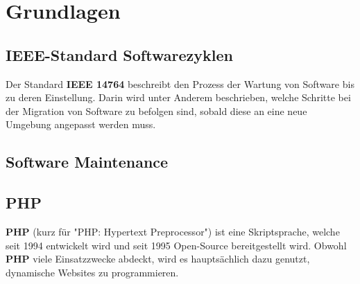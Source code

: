\chapter{Grundlagen}\label{ch:grundlagen}

\section{IEEE-Standard Softwarezyklen}
Der Standard \textbf{IEEE 14764} beschreibt den Prozess der Wartung von Software bis zu deren Einstellung.
Darin wird unter Anderem beschrieben, welche Schritte bei der Migration von Software zu befolgen sind, sobald diese an eine neue Umgebung angepasst werden muss.

\section{Software Maintenance}

\section{PHP}
\textbf{PHP} (kurz für "PHP: Hypertext Preprocessor") ist eine Skriptsprache, welche seit 1994 entwickelt wird und seit 1995 Open-Source bereitgestellt wird.
Obwohl \textbf{PHP} viele Einsatzzwecke abdeckt, wird es hauptsächlich dazu genutzt, dynamische Websites zu programmieren.
